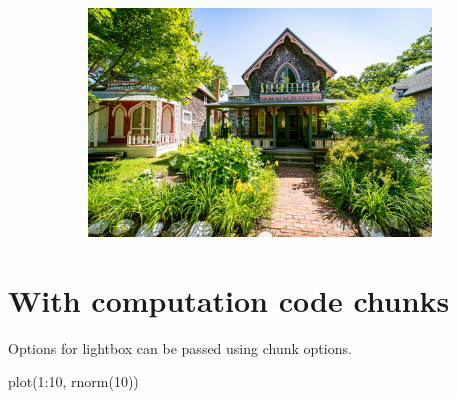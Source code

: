 \documentclass[
  a4paper,
  DIV=11,
  numbers=noendperiod,
  oneside,
  open=any]{scrreprt}
\newenvironment{Shaded}{\begin{snugshade}}{\end{snugshade}}
\newcommand{\DecValTok}[1]{\textcolor[rgb]{0.68,0.00,0.00}{#1}}
\newcommand{\FunctionTok}[1]{\textcolor[rgb]{0.28,0.35,0.67}{#1}}
\newcommand{\NormalTok}[1]{\textcolor[rgb]{0.00,0.23,0.31}{#1}}
\newcommand{\SpecialCharTok}[1]{\textcolor[rgb]{0.37,0.37,0.37}{#1}}
\begin{document}
\begin{figure}
\begin{minipage}{0.50\linewidth}
\begin{figure}[H]
{}


\end{figure}%

\end{minipage}%
\newline
\begin{minipage}{\linewidth}

\begin{figure}[H]

{\centering \includegraphics{images/mv-2.jpg}

}


\end{figure}%

\end{minipage}%

\end{figure}%

\section{With computation code
chunks}\label{with-computation-code-chunks}

Options for lightbox can be passed using chunk options.

\begin{Shaded}
\begin{Highlighting}[]
\FunctionTok{plot}\NormalTok{(}\DecValTok{1}\SpecialCharTok{:}\DecValTok{10}\NormalTok{, }\FunctionTok{rnorm}\NormalTok{(}\DecValTok{10}\NormalTok{))}
\end{Highlighting}
\end{Shaded}
\end{document}
